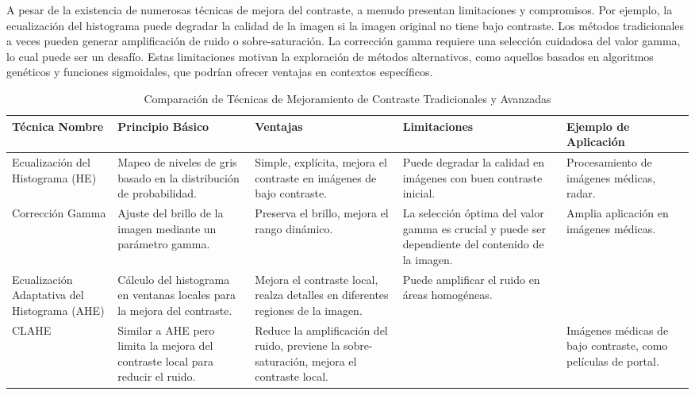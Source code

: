 A pesar de la existencia de numerosas técnicas de mejora del contraste, a menudo presentan limitaciones y compromisos. Por ejemplo, la ecualización del histograma puede degradar la calidad de la imagen si la imagen original no tiene bajo contraste. Los métodos tradicionales a veces pueden generar amplificación de ruido o sobre-saturación. La corrección gamma requiere una selección cuidadosa del valor gamma, lo cual puede ser un desafío. Estas limitaciones motivan la exploración de métodos alternativos, como aquellos basados en algoritmos genéticos y funciones sigmoidales, que podrían ofrecer ventajas en contextos específicos.

\begin{table}[htbp]
    \centering
    \caption{Comparación de Técnicas de Mejoramiento de Contraste Tradicionales y Avanzadas}
    \begin{adjustbox}{max width=\textwidth}
    \begin{tabular}{|p{3cm}|p{3cm}|p{3cm}|p{3cm}|p{3cm}|}
    \hline
    \textbf{Técnica Nombre} & \textbf{Principio Básico} & \textbf{Ventajas} & \textbf{Limitaciones} & \textbf{Ejemplo de Aplicación} \\
    \hline
    Ecualización del Histograma (HE) & Mapeo de niveles de gris basado en la distribución de probabilidad. & Simple, explícita, mejora el contraste en imágenes de bajo contraste. & Puede degradar la calidad en imágenes con buen contraste inicial. & Procesamiento de imágenes médicas, radar. \\
    \hline
    Corrección Gamma & Ajuste del brillo de la imagen mediante un parámetro gamma. & Preserva el brillo, mejora el rango dinámico. & La selección óptima del valor gamma es crucial y puede ser dependiente del contenido de la imagen. & Amplia aplicación en imágenes médicas. \\
    \hline
    Ecualización Adaptativa del Histograma (AHE) & Cálculo del histograma en ventanas locales para la mejora del contraste. & Mejora el contraste local, realza detalles en diferentes regiones de la imagen. & Puede amplificar el ruido en áreas homogéneas. & \\
    \hline
    CLAHE & Similar a AHE pero limita la mejora del contraste local para reducir el ruido. & Reduce la amplificación del ruido, previene la sobre-saturación, mejora el contraste local. & & Imágenes médicas de bajo contraste, como películas de portal. \\
    \hline
    \end{tabular}
    \end{adjustbox}
\end{table}


